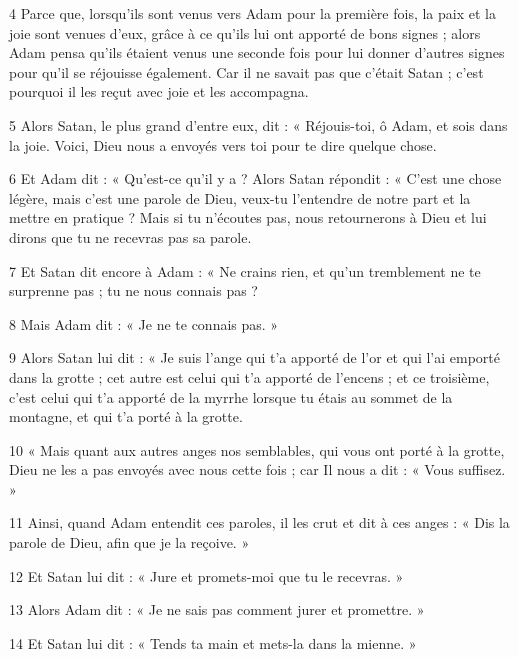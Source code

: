 \par 4 Parce que, lorsqu'ils sont venus vers Adam pour la première fois, la paix et la joie sont venues d'eux, grâce à ce qu'ils lui ont apporté de bons signes ; alors Adam pensa qu'ils étaient venus une seconde fois pour lui donner d'autres signes pour qu'il se réjouisse également. Car il ne savait pas que c'était Satan ; c'est pourquoi il les reçut avec joie et les accompagna.

\par 5 Alors Satan, le plus grand d'entre eux, dit : « Réjouis-toi, ô Adam, et sois dans la joie. Voici, Dieu nous a envoyés vers toi pour te dire quelque chose.

\par 6 Et Adam dit : « Qu'est-ce qu'il y a ? Alors Satan répondit : « C’est une chose légère, mais c’est une parole de Dieu, veux-tu l’entendre de notre part et la mettre en pratique ? Mais si tu n’écoutes pas, nous retournerons à Dieu et lui dirons que tu ne recevras pas sa parole.

\par 7 Et Satan dit encore à Adam : « Ne crains rien, et qu'un tremblement ne te surprenne pas ; tu ne nous connais pas ?

\par 8 Mais Adam dit : « Je ne te connais pas. »

\par 9 Alors Satan lui dit : « Je suis l'ange qui t'a apporté de l'or et qui l'ai emporté dans la grotte ; cet autre est celui qui t'a apporté de l'encens ; et ce troisième, c'est celui qui t'a apporté de la myrrhe lorsque tu étais au sommet de la montagne, et qui t'a porté à la grotte.

\par 10 « Mais quant aux autres anges nos semblables, qui vous ont porté à la grotte, Dieu ne les a pas envoyés avec nous cette fois ; car Il nous a dit : « Vous suffisez. »

\par 11 Ainsi, quand Adam entendit ces paroles, il les crut et dit à ces anges : « Dis la parole de Dieu, afin que je la reçoive. »

\par 12 Et Satan lui dit : « Jure et promets-moi que tu le recevras. »

\par 13 Alors Adam dit : « Je ne sais pas comment jurer et promettre. »

\par 14 Et Satan lui dit : « Tends ta main et mets-la dans la mienne. »

